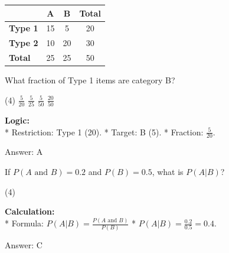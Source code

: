 \documentclass[11pt,paper=a4,answers]{exam}
\begin{document}
\begin{questions}
\question
\begin{center}
\begin{tabular}{|l|c|c|c|}
\hline
 & \textbf{A} & \textbf{B} & \textbf{Total} \\ \hline
\textbf{Type 1} & 15 & 5 & 20 \\ \hline
\textbf{Type 2} & 10 & 20 & 30 \\ \hline
\textbf{Total} & 25 & 25 & 50 \\ \hline
\end{tabular}
\end{center}
What fraction of Type 1 items are category B?
\begin{tasks}(4)
    \task $\frac{5}{20}$
    \task $\frac{5}{25}$
    \task $\frac{5}{50}$
    \task $\frac{20}{50}$
\end{tasks}

\begin{solution}
\textbf{Logic:} \\
* Restriction: Type 1 (20).
* Target: B (5).
* Fraction: $\frac{5}{20}$.

\vspace{30pt}

Answer: \colorbox{yellow!100}{A}
\end{solution}

\vspace{60pt}

\question
If $P(A \text{ and } B) = 0.2$ and $P(B) = 0.5$, what is $P(A|B)$?
\begin{tasks}(4)
\end{tasks}

\begin{solution}
\textbf{Calculation:} \\
* Formula: $P(A|B) = \frac{P(A \text{ and } B)}{P(B)}$
* $P(A|B) = \frac{0.2}{0.5} = 0.4$.

\vspace{30pt}

Answer: \colorbox{yellow!100}{C}
\end{solution}

\vspace{60pt}


\end{questions}
\end{document}
